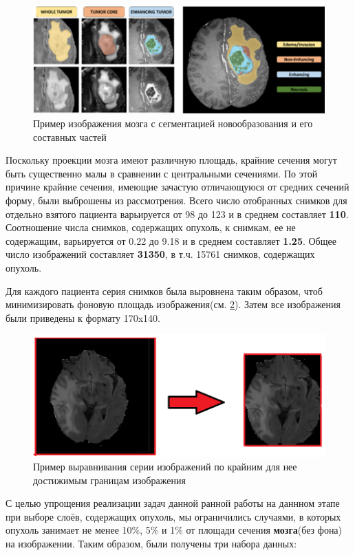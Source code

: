 \begin{figure}[ht] 
  \center
  \includegraphics [scale=0.6] {images/brats.png}
  \caption{ Пример изображения мозга с сегментацией новообразования и его составных частей} 
  \label{fig:bratss}  
\end{figure}
Поскольку проекции мозга имеют различную площадь, крайние сечения могут быть существенно малы в сравнении с центральными сечениями. По этой причине крайние сечения, имеющие зачастую отличающуюся от средних сечений форму, были выброшены из рассмотрения. Всего число отобранных снимков для отдельно взятого пациента варьируется от 98 до 123 и в среднем составляет {\bf 110}. Соотношение числа снимков, содержащих опухоль, к снимкам, ее не содержащим, варьируется от 0.22 до 9.18 и в среднем составляет {\bf 1.25}. Общее число изображений составляет {\bf 31350}, в т.ч. 15761 снимков, содержащих опухоль. 

Для каждого пациента серия снимков была выровнена таким образом, чтоб минимизировать фоновую площадь изображения(см. \ref{fig:transform}). Затем все изображения были приведены к формату 170x140.

\begin{figure}[ht] 
  \center
  \includegraphics [scale=0.6] {images/transform.png}
  \caption{ Пример выравнивания серии изображений по крайним для нее достижимым границам изображения} 
  \label{fig:transform}  
\end{figure}

С целью упрощения реализации задач данной ранной работы на даннном этапе при выборе слоёв, содержащих опухоль, мы ограничились случаями, в которых опухоль занимает не менее 10\%, 5\% и 1\% от площади сечения {\bf мозга}(без фона) на изображении. Таким образом, были получены три набора данных:

